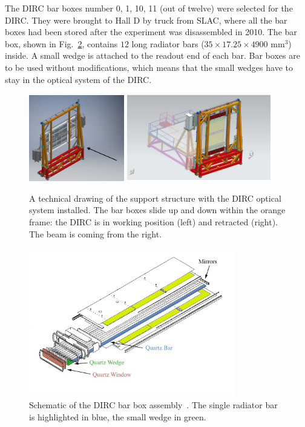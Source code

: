 The \babar DIRC bar boxes number 0, 1, 10, 11 (out of twelve) were selected for the \gluex DIRC. They were brought to Hall D by truck from SLAC, where all the bar boxes had been stored after the \babar experiment was disassembled in 2010. The bar box, shown in Fig.~\ref{pic:bbox}, contains $12$ long radiator bars ($35 \times 17.25 \times 4900 $ mm$^3$) inside. A small wedge is attached to the readout end of each bar. Bar boxes are to be used without modifications, which means that the small wedges have to stay in the optical system of the \gluex DIRC.

\begin{figure}[h]
\centering
\includegraphics[width=0.37\textwidth]{pics/support.png} \hspace{0.2cm}
\includegraphics[width=0.56\textwidth]{pics/Full_Assy_Iso-retracted.pdf}
\caption{\label{pic:support}} A technical drawing of the support structure with the DIRC optical system installed. 
The bar boxes slide up and down within the orange frame: the DIRC is in working position (left) and retracted (right). 
The beam is coming from the right.
\end{figure}

\begin{figure}[!h]
\centering
\includegraphics[width=0.8\textwidth]{pics/bab_col.jpg}
\caption{\label{pic:bbox} Schematic of the \babar DIRC bar box assembly~\cite{bdirc1}. The single radiator bar is highlighted in blue, the small wedge in green.}
\end{figure}

